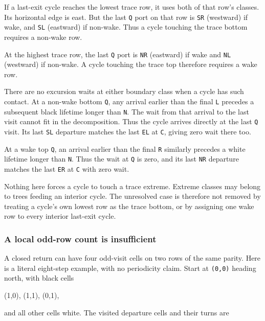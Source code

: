 \documentclass[11pt,letterpaper]{article}
\theoremstyle{plain}
\theoremstyle{definition}
\begin{document}
\begin{NoHyper}
If a last-exit cycle reaches the lowest trace row, it uses both of that row's classes. Its horizontal edge is east. But the last \texttt{Q} port on that row is \texttt{SR} (westward) if wake, and \texttt{SL} (eastward) if non-wake. Thus a cycle touching the trace bottom requires a non-wake row.

At the highest trace row, the last \texttt{Q} port is \texttt{NR} (eastward) if wake and \texttt{NL} (westward) if non-wake. A cycle touching the trace top therefore requires a wake row.

There are no excursion waits at either boundary class when a cycle has such contact. At a non-wake bottom \texttt{Q}, any arrival earlier than the final \texttt{L} precedes a subsequent black lifetime longer than \texttt{N}. The wait from that arrival to the last visit cannot fit in the decomposition. Thus the cycle arrives directly at the last \texttt{Q} visit. Its last \texttt{SL} departure matches the last \texttt{EL} at \texttt{C}, giving zero wait there too.

At a wake top \texttt{Q}, an arrival earlier than the final \texttt{R} similarly precedes a white lifetime longer than \texttt{N}. Thus the wait at \texttt{Q} is zero, and its last \texttt{NR} departure matches the last \texttt{ER} at \texttt{C} with zero wait.

Nothing here forces a cycle to touch a trace extreme. Extreme classes may belong to trees feeding an interior cycle. The unresolved case is therefore not removed by treating a cycle's own lowest row as the trace bottom, or by assigning one wake row to every interior last-exit cycle.

\subsubsection{A local odd-row count is insufficient}

A closed return can have four odd-visit cells on two rows of the same parity. Here is a literal eight-step example, with no periodicity claim. Start at \texttt{(0,0)} heading north, with black cells

\begin{codeblock}
(1,0), (1,1), (0,1),
\end{codeblock}

and all other cells white. The visited departure cells and their turns are


\end{NoHyper}
\end{document}
